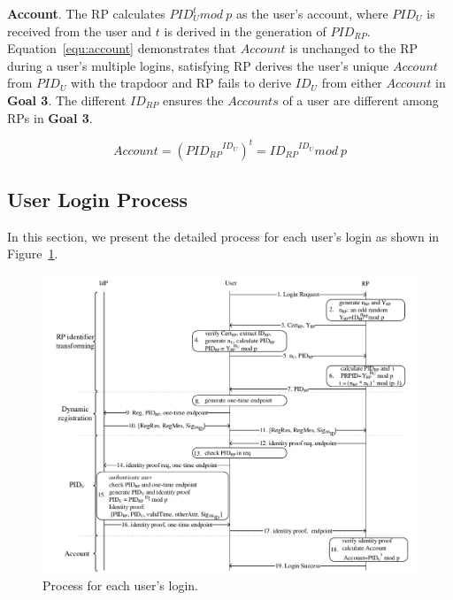 \noindent\textbf{Account}. The RP calculates $PID_U^t mod \ p$ as the  user's account, where $PID_U$ is received from the user and $t$ is derived in the generation of $PID_{RP}$. Equation~\ref{equ:account} demonstrates that $Account$ is unchanged to the RP during a user's multiple logins, satisfying RP derives the user's unique $Account$  from $PID_U$ with the  trapdoor and  RP fails to derive $ID_U$ from either $Account$ in \textbf{Goal 3}. The different $ID_{RP}$ ensures the $Accounts$ of a user are different among RPs in \textbf{Goal 3}.

 \begin{equation}
   Account = ({PID_{RP}}^{ID_U})^t = {ID_{RP}}^{ID_U} mod \ p
   \label{equ:account}
   \end{equation}


\subsection{User Login Process}
\label{sebsec:loginprocess}
In this section, we present the detailed process for each user's login as shown in Figure~\ref{fig:process}. %

\begin{figure}
  \centering
  \includegraphics[width=0.85\linewidth]{fig/process.pdf}
  \caption{Process for each user's login.}
  \label{fig:process}
\end{figure}

